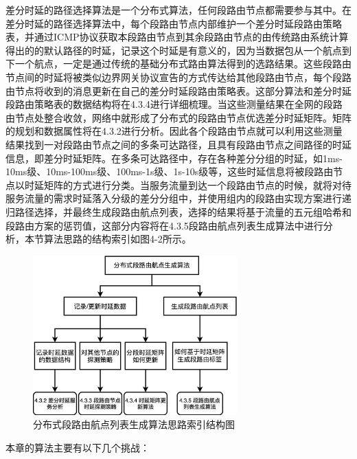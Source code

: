 差分时延的路径选择算法是一个分布式算法，任何段路由节点都需要参与其中。在差分时延的路径选择算法中，每个段路由节点内部维护一个差分时延段路由策略表，并通过ICMP协议获取本段路由节点到其余段路由节点的由传统路由系统计算得出的的默认路径的时延，记录这个时延是有意义的，因为当数据包从一个航点到下一个航点，一定是通过传统的基础分布式路由算法得到的选路结果。这些段路由节点间的时延将被类似边界网关协议宣告的方式传达给其他段路由节点，每个段路由节点将收到的消息更新在自己的差分时延段路由策略表。这部分算法和差分时延段路由策略表的数据结构将在4.3.4进行详细梳理。当这些测量结果在全网的段路由节点处整合收敛，网络中就形成了分布式的段路由节点优选差分时延矩阵。矩阵的规划和数据属性将在4.3.2进行分析。因此各个段路由节点就可以利用这些测量结果找到一对段路由节点之间的多条可达路径，且具有段路由节点之间路径的时延信息，即差分时延矩阵。在多条可达路径中，存在各种差分分组的时延，如1ms-10ms级、10ms-100ms级、100ms-1s级、1s-10s级等，这些时延信息将被段路由节点以时延矩阵的方式进行分类。当服务流量到达一个段路由节点的时候，就将对待服务流量的需求时延落入分级的差分分组中，并使用组内的段路由实现方案进行递归路径选择，并最终生成段路由航点列表，选择的结果将基于流量的五元组哈希和段路由方案的惩罚值，这部分内容将在4.3.5段路由航点列表生成算法中进行分析，本节算法思路的结构索引如图4-2所示。

\begin{figure}[htbp]
\setlength{\abovecaptionskip}{15pt plus 3pt minus 2pt}
\centerline{\includegraphics[width=0.7\textwidth]{./figures/ch4-ark.png}}
\caption{分布式段路由航点列表生成算法思路索引结构图}
\label{fig-ch4-ark}
\end{figure}

本章的算法主要有以下几个挑战：

